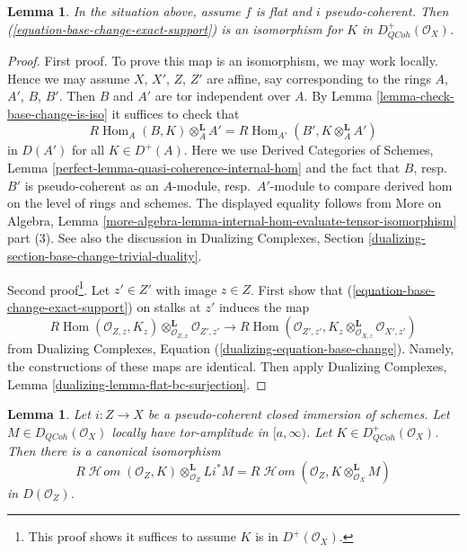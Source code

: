\documentclass{stacks-project}
\theoremstyle{plain}
\newtheorem{lemma}[subsection]{Lemma}
\theoremstyle{definition}
\theoremstyle{remark}
\numberwithin{equation}{subsection}
\def\Hom{\mathop{\mathrm{Hom}}\nolimits}
\def\SheafHom{\mathop{\mathcal{H}\!\mathit{om}}\nolimits}
\def\QCoh{\mathit{QCoh}}
\begin{document}
\begin{lemma}
\label{lemma-flat-bc-sheaf-with-exact-support}
In the situation above, assume $f$ is flat and $i$ pseudo-coherent.
Then (\ref{equation-base-change-exact-support}) is an isomorphism
for $K$ in $D^+_\QCoh(\mathcal{O}_X)$.
\end{lemma}

\begin{proof}
First proof. To prove this map is an isomorphism, we may work locally.
Hence we may assume $X$, $X'$, $Z$, $Z'$ are affine, say corresponding
to the rings $A$, $A'$, $B$, $B'$. Then $B$ and $A'$ are tor independent
over $A$. By Lemma \ref{lemma-check-base-change-is-iso} it suffices
to check that
$$
R\Hom_A(B, K) \otimes_A^\mathbf{L} A' =
R\Hom_{A'}(B', K \otimes_A^\mathbf{L} A')
$$
in $D(A')$ for all $K \in D^+(A)$. Here we use
Derived Categories of Schemes, Lemma
\ref{perfect-lemma-quasi-coherence-internal-hom}
and the fact that $B$, resp.\ $B'$ is pseudo-coherent as an
$A$-module, resp.\ $A'$-module
to compare derived hom on the level of rings and schemes.
The displayed equality follows from
More on Algebra, Lemma
\ref{more-algebra-lemma-internal-hom-evaluate-tensor-isomorphism}
part (3). See also the discussion in Dualizing Complexes, Section
\ref{dualizing-section-base-change-trivial-duality}.

\medskip\noindent
Second proof\footnote{This proof shows
it suffices to assume $K$ is in $D^+(\mathcal{O}_X)$.}.
Let $z' \in Z'$ with image $z \in Z$.
First show that (\ref{equation-base-change-exact-support})
on stalks at $z'$ induces the map
$$
R\Hom(\mathcal{O}_{Z, z}, K_z)
\otimes_{\mathcal{O}_{Z, x}}^\mathbf{L} \mathcal{O}_{Z', z'}
\longrightarrow
R\Hom(\mathcal{O}_{Z', z'},
K_z \otimes_{\mathcal{O}_{X, z}}^\mathbf{L} \mathcal{O}_{X', z'})
$$
from Dualizing Complexes, Equation (\ref{dualizing-equation-base-change}).
Namely, the constructions of these maps are identical.
Then apply Dualizing Complexes, Lemma \ref{dualizing-lemma-flat-bc-surjection}.
\end{proof}

\begin{lemma}
\label{lemma-sheaf-with-exact-support-tensor}
Let $i : Z \to X$ be a pseudo-coherent closed immersion of schemes.
Let $M \in D_\QCoh(\mathcal{O}_X)$ locally have tor-amplitude in $[a, \infty)$.
Let $K \in D_\QCoh^+(\mathcal{O}_X)$. Then there is a canonical isomorphism
$$
R\SheafHom(\mathcal{O}_Z, K) \otimes_{\mathcal{O}_Z}^\mathbf{L} Li^*M =
R\SheafHom(\mathcal{O}_Z, K \otimes_{\mathcal{O}_X}^\mathbf{L} M)
$$
in $D(\mathcal{O}_Z)$.
\end{lemma}
\end{document}
